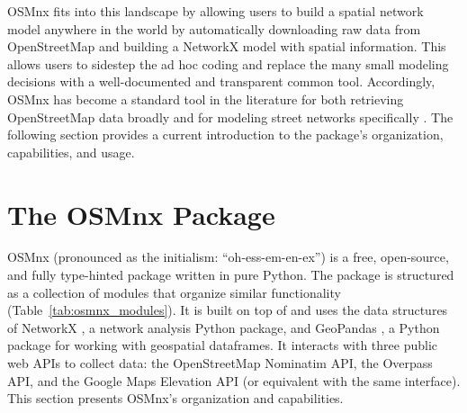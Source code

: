 \documentclass[12pt,letterpaper]{article} %
\begin{document}
OSMnx fits into this landscape by allowing users to build a spatial network model anywhere in the world by automatically downloading raw data from OpenStreetMap and building a NetworkX model with spatial information. This allows users to sidestep the ad hoc coding and replace the many small modeling decisions with a well-documented and transparent common tool. Accordingly, OSMnx has become a standard tool in the literature for both retrieving OpenStreetMap data broadly and for modeling street networks specifically \citep{boeing_right_2020}. The following section provides a current introduction to the package's organization, capabilities, and usage.

\section{The OSMnx Package}

OSMnx (pronounced as the initialism: \enquote{oh-ess-em-en-ex}) is a free, open-source, and fully type-hinted package written in pure Python. The package is structured as a collection of modules that organize similar functionality (Table~\ref{tab:osmnx_modules}). It is built on top of and uses the data structures of NetworkX \citep{hagberg_exploring_2008}, a network analysis Python package, and GeoPandas \citep{van_den_bossche_geopandasgeopandas_2024}, a Python package for working with geospatial dataframes. It interacts with three public web APIs to collect data: the OpenStreetMap Nominatim API, the Overpass API, and the Google Maps Elevation API (or equivalent with the same interface). This section presents OSMnx's organization and capabilities.
\end{document}
